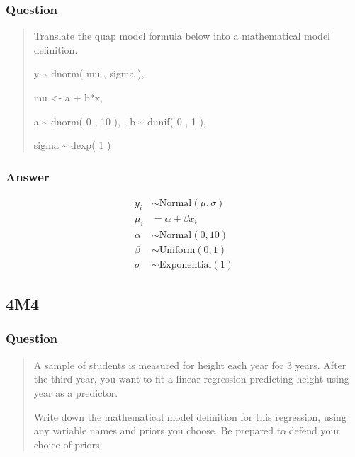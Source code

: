 \documentclass[
]{book}
\begin{document}
\hypertarget{question-40}{%
\subsubsection*{Question}\label{question-40}}

\begin{quote}
Translate the quap model formula below into a mathematical model definition.

y \textasciitilde{} dnorm( mu , sigma ),

mu \textless- a + b*x,

a \textasciitilde{} dnorm( 0 , 10 ),
.
b \textasciitilde{} dunif( 0 , 1 ),

sigma \textasciitilde{} dexp( 1 )
\end{quote}

\hypertarget{answer-40}{%
\subsubsection{Answer}\label{answer-40}}

\[
\begin{aligned}
y_i &\sim \text{Normal}(\mu, \sigma) \\
\mu_i &= \alpha + \beta x_i\\
\alpha &\sim  \text{Normal}(0, 10) \\
\beta & \sim \text{Uniform}(0,1) \\
\sigma & \sim \text{Exponential}(1)
\end{aligned}
\]

\hypertarget{m4-2}{%
\subsection*{4M4}\label{m4-2}}

\hypertarget{question-41}{%
\subsubsection*{Question}\label{question-41}}

\begin{quote}
A sample of students is measured for height each year for 3 years. After the third year, you want to fit a linear regression predicting height using year as a predictor.

Write down the mathematical model definition for this regression, using any variable names and priors you choose. Be prepared to defend your choice of priors.
\end{quote}
\end{document}
